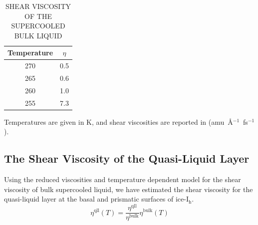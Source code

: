 \begin{table}[h] \centering \caption{SHEAR VISCOSITY OF THE
    SUPERCOOLED BULK LIQUID\label{tab:bulkVisco}}
\begin{tabular}{cc}
\hline
\hline
 Temperature & $\eta$ \\
\hline
270 & 0.5 \\
265 & 0.6 \\
260 & 1.0  \\
255 & 7.3 \\
\hline
\hline
\end{tabular}
\begin{flushleft}
  Temperatures are given in K, and shear viscosities are reported in
  (amu~\AA$^{-1}$~fs$^{-1}$).
\end{flushleft}
\end{table}


\subsection{The Shear Viscosity of the Quasi-Liquid Layer}
Using the reduced viscosities and temperature dependent model for the
shear viscosity of bulk supercooled liquid, we have estimated the
shear viscosity for the quasi-liquid layer at the basal and prismatic
surfaces of ice-I$_\mathrm{h}$.
\begin{equation}\label{eq:qllT}
\eta^{\mathrm{qll}}(T) = \frac{\eta^{\mathrm{qll}}}{\eta^{\mathrm{bulk}}}\eta^{\mathrm{bulk}}(T)
\end{equation}


